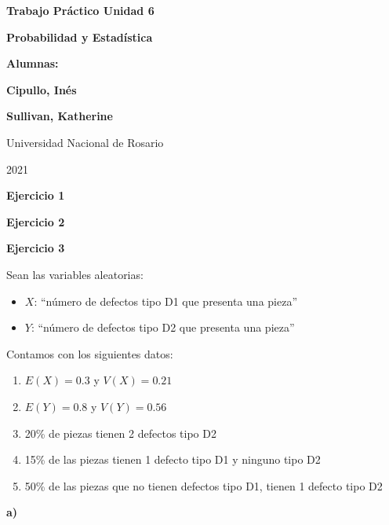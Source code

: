 \documentclass[11pt]{article}
\begin{document}
\begin{titlepage}
    \begin{center}
        \vfill
        \vfill
            \vspace{0.7cm}
            \noindent\textbf{\Huge Trabajo Pr\'actico Unidad 6}\par
            \noindent\textbf{\Huge Probabilidad y Estad\'istica}\par
            \vspace{.5cm}
        \vfill
        \noindent \textbf{\huge Alumnas:}\par
        \vspace{.5cm}
        \noindent \textbf{\Large Cipullo, In\'es}\par
        \noindent \textbf{\Large Sullivan, Katherine}\par
 
        \vfill
        \large Universidad Nacional de Rosario \par
        \noindent\large 2021
    \end{center}
\end{titlepage}
\par


\textbf{Ejercicio 1}

\textbf{Ejercicio 2}

\textbf{Ejercicio 3}

Sean las variables aleatorias:
\begin{itemize}
    \item $X$: ``n\'umero de defectos tipo D1 que presenta una pieza''
    \item $Y$: ``n\'umero de defectos tipo D2 que presenta una pieza''
\end{itemize}
Contamos con los siguientes datos:
\begin{enumerate}
    \item $E(X) = 0.3$ y $V(X) = 0.21$
    \item $E(Y) = 0.8$ y $V(Y) = 0.56$
    \item 20\% de piezas tienen 2 defectos tipo D2
    \item 15\% de las piezas tienen 1 defecto tipo D1 y ninguno tipo D2
    \item 50\% de las piezas que no tienen defectos tipo D1, tienen 1 defecto tipo D2
\end{enumerate}

\textbf{a)}
\end{document}
